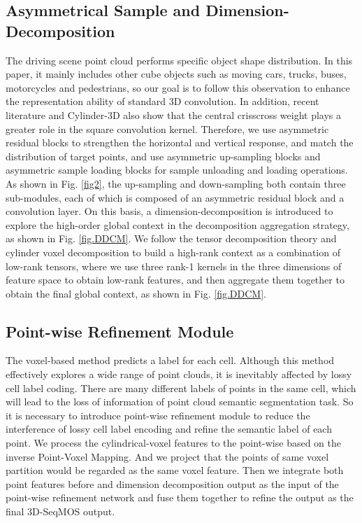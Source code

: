 \documentclass[lettersize,journal]{IEEEtran}
\begin{document}
\subsection{Asymmetrical Sample and Dimension-Decomposition}
The driving scene point cloud performs specific object shape distribution. In this paper, it mainly includes other cube objects such as moving cars, trucks, buses, motorcycles and pedestrians, so our goal is to follow this observation to enhance the representation ability of standard 3D convolution. In addition, recent literature \cite{ding2019acnet} and Cylinder-3D \cite{zhu2021cylindrical} also show that the central crisscross weight plays a greater role in the square convolution kernel. Therefore, we use asymmetric residual blocks to strengthen the horizontal and vertical response, and match the distribution of target points, and use asymmetric up-sampling blocks and asymmetric sample loading blocks for sample unloading and loading operations. As shown in Fig. \ref{fig2}, the up-sampling and down-sampling both contain three sub-modules, each of which is composed of an asymmetric residual block and a convolution layer. On this basis, a dimension-decomposition is introduced to explore the high-order global context in the decomposition aggregation strategy, as shown in Fig. \ref{fig.DDCM}. We follow the tensor decomposition theory \cite{chen2020tensor} and cylinder voxel decomposition to build a high-rank context as a combination of low-rank tensors, where we use three rank-1 kernels in the three dimensions of feature space to obtain low-rank features, and then aggregate them together to obtain the final global context, as shown in Fig. \ref{fig.DDCM}.


\subsection{Point-wise Refinement Module}
The voxel-based method predicts a label for each cell. Although this method effectively explores a wide range of point clouds, it is inevitably affected by lossy cell label coding. There are many different labels of points in the same cell, which will lead to the loss of information of point cloud semantic segmentation task. So it is necessary to introduce point-wise refinement module to reduce the interference of lossy cell label encoding and refine the semantic label of each point. We process the cylindrical-voxel features to the point-wise based on the inverse Point-Voxel Mapping. And we project that the points of same voxel partition would be regarded as the same voxel feature. Then we integrate both point features before and dimension decomposition output as the input of the point-wise refinement network and fuse them together to refine the output as the final 3D-SeqMOS output.
\end{document}
